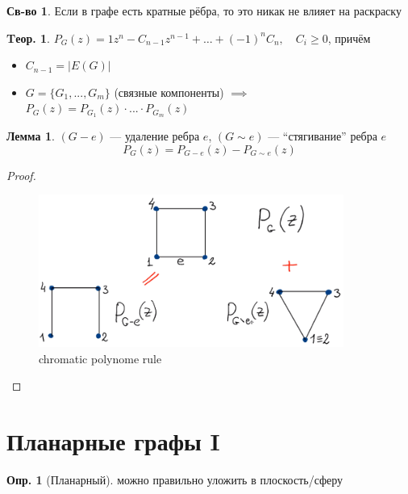 \documentclass[a4paper,12pt]{article}
\theoremstyle{definition}
\newtheorem{definition}{Опр.}[section]
\newtheorem*{property}{Св-во}  %
\theoremstyle{definition}
\newtheorem{theorem}{Tеор.}[section]
\newtheorem{lemma}{Лемма}[section]
\begin{document}
\begin{property}
	Если в графе есть кратные рёбра, то это никак не влияет на раскраску
\end{property}

\begin{theorem}
	$ P_G(z) = 1 z^n - C_{n-1} z^{n-1} +\dots + (-1)^n C_n, \quad C_i \geqslant 0 $,
	причём
	\begin{itemize}
		\item  $C_{n-1} = |E(G)|$
		\item  $G=\{G_1,...,G_m\}$ (связные компоненты)
		       $\implies$ $P_G(z) = P_{G_1}(z) \cdot ... \cdot P_{G_m}(z)$ 
	\end{itemize}
\end{theorem}

\def\iiRemoveEdge{-}
\def\iiPullEdge{\sim}

\begin{lemma} $(G \iiRemoveEdge e)$ --- удаление ребра $e$,
	          $(G \iiPullEdge e)$ --- ``стягивание'' ребра $e$
	\[ P_{G}(z) = P_{G \iiRemoveEdge e}(z) - P_{G \iiPullEdge e}(z) \]
\end{lemma}
\begin{proof}
	\hspace{1pt}
	\begin{figure}[H]
		\centering
		\includegraphics[width=10cm]{chromatic-polynome-rule.png}
		\caption{chromatic polynome rule}
	\end{figure}
	\hspace{1pt}
\end{proof}



\section{Планарные графы I}

\begin{definition}[Планарный] можно правильно уложить в плоскость/сферу \end{definition}
\end{document}
